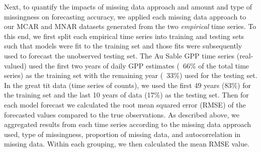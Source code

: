 \documentclass[12pt,english]{article} %
\begin{document}
\begin{linenumbers}
\begin{spacing}{1.9}
\begin{flushleft}
\hspace{1em} Next, to quantify the impacts of missing data approach and amount and type of missingness on forecasting accuracy, we applied each missing data approach to our MCAR and MNAR datasets generated from the two \textit{empirical} time series. To this end, we first split each empirical time series into training and testing sets such that models were fit to the training set and those fits were subsequently used to forecast the unobserved testing set. The Au Sable GPP time series (real-valued) used the first two years of daily GPP estimates (~66\% of the total time series) as the training set with the remaining year (~33\%) used for the testing set. In the great tit data (time series of counts), we used the first 49 years (83\%) for the training set and the last 10 years of data (17\%) as the testing set. Then for each model forecast we calculated the root mean squared error (RMSE) of the forecasted values compared to the true observations. As described above, we aggregated results from each time series according to the missing data approach used, type of missingness, proportion of missing data, and autocorrelation in missing data. Within each grouping, we then calculated the mean RMSE value.





\end{flushleft}
\end{spacing}
\end{linenumbers}
\end{document}
